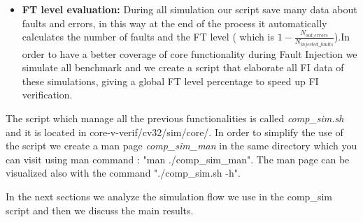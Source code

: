 {\begin{itemize}
        We choose Statistical Fault Injection since it is the most common used methods, it exists also analytical estimation of FT level  and ground radiation test.
        
        \item \textbf{FT level evaluation:} During all simulation our script save many data about faults and errors, in this way at the end of the process it automatically calculates the number of faults and the FT level ( which is $1-\frac{N_{out\_errors}}{N_{injected\_faults}}$).In order to have a better coverage of core functionality during Fault Injection we simulate all benchmark and we create a script that elaborate all FI data of these simulations, giving a global FT level percentage to speed up FI verification.
    \end{itemize}
    
    The script which manage all the previous functionalities is called \textit{comp\_sim.sh} and it is located in core-v-verif/cv32/sim/core/. In order to simplify the use of the script we create a man page \textit{comp\_sim\_man} in the same directory which  you can visit using man command : \linebreak "man ./comp\_sim\_man". 
    The man page can be visualized also with the command \linebreak"./comp\_sim.sh -h".
    
    In the next sections we analyze the simulation flow we use in the comp\_sim script and then we discuss the main results.
    \newpage
}
